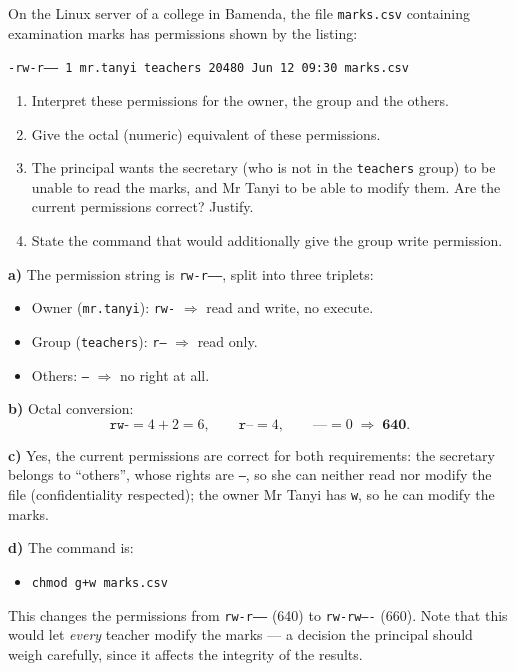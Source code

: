\documentclass[11pt]{article}
\newcommand{\cle}[1]{{\popxbold\color{popdark}#1}}
\begin{document}
\begin{exoresolu}
On the Linux server of a college in Bamenda, the file \texttt{marks.csv} containing examination marks has permissions shown by the listing:
\begin{center}
\texttt{-rw-r----- 1 mr.tanyi teachers 20480 Jun 12 09:30 marks.csv}
\end{center}
\begin{enumerate}
\item[a)] Interpret these permissions for the owner, the group and the others.
\item[b)] Give the octal (numeric) equivalent of these permissions.
\item[c)] The principal wants the secretary (who is not in the \texttt{teachers} group) to be unable to read the marks, and Mr Tanyi to be able to modify them. Are the current permissions correct? Justify.
\item[d)] State the command that would additionally give the group write permission.
\end{enumerate}
\tcblower
\textbf{a)} The permission string is \texttt{rw-r-----}, split into three triplets:
\begin{itemize}
\item Owner (\texttt{mr.tanyi}): \texttt{rw-} $\Rightarrow$ read and write, no execute.
\item Group (\texttt{teachers}): \texttt{r--} $\Rightarrow$ read only.
\item Others: \texttt{---} $\Rightarrow$ no right at all.
\end{itemize}

\textbf{b)} Octal conversion:
\[ \texttt{rw-} = 4+2 = 6, \qquad \texttt{r--} = 4, \qquad \texttt{---} = 0 \;\Rightarrow\; \textbf{640}. \]

\textbf{c)} Yes, the current permissions are correct for both requirements: the secretary belongs to ``others'', whose rights are \texttt{---}, so she can neither read nor modify the file (confidentiality respected); the owner Mr Tanyi has \texttt{w}, so he can modify the marks.

\textbf{d)} The command is:
\begin{itemize}
\item[] \texttt{chmod g+w marks.csv}
\end{itemize}
This changes the permissions from \texttt{rw-r-----} (640) to \texttt{rw-rw----} (660). Note that this would let \emph{every} teacher modify the marks — a decision the principal should weigh carefully, since it affects the \cle{integrity} of the results.
\end{exoresolu}
\end{document}
